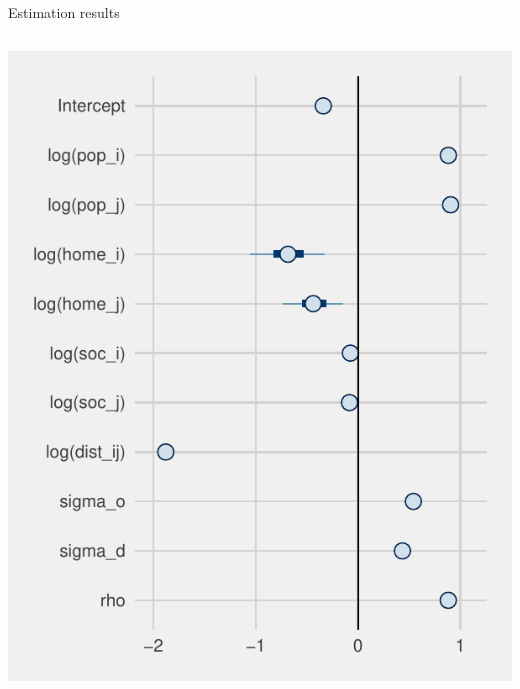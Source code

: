 \documentclass{beamer}
\begin{document}
\begin{frame}{Estimation results}
\begin{columns}
\begin{column}{0.5\textwidth}
			\begin{center}
				\includegraphics[width=\textwidth]{../../fig/forestplot}      
			\end{center}
		\end{column}
	\end{columns}
\end{frame}
\end{document}
